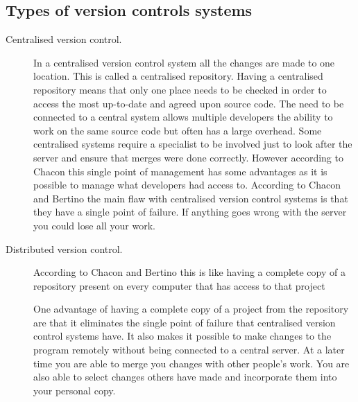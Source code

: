 
\subsection{Types of version controls systems}
\begin{description}

  \item [Centralised version control.] 
  In a centralised version control system all the changes are made to one location.
  This is called a centralised repository.
  Having a centralised repository means that only one place needs to be checked in order to access the most up-to-date and agreed upon source code.
  The need to be connected to a central system allows multiple developers the ability to work on the same source code but often has a large overhead.
  Some centralised systems require a specialist to be involved just to look after the server and ensure that merges were done correctly.
  However according to Chacon \cite{Chacon2009} this single point of management has some advantages as it is possible to manage what developers had access to. 
  According to Chacon \cite{Chacon2009} and Bertino \cite{Bertino2012} the main flaw with centralised version control systems is that they have a single point of failure.
  If anything goes wrong with the server you could lose all your work.

  \item [Distributed version control.] 
  According to Chacon \cite{Chacon2009} and Bertino \cite{Bertino2012} this is like having a complete copy of a repository present on every computer that has access to that project

  One advantage of having a complete copy of a project from the repository are that it eliminates the single point of failure that centralised version control systems have.
  It also makes it possible to make changes to the program remotely without being connected to a central server.
  At a later time you are able to merge you changes with other people's work.  
  You are also able to select changes others have made and incorporate them into your personal copy.


\end{description}
